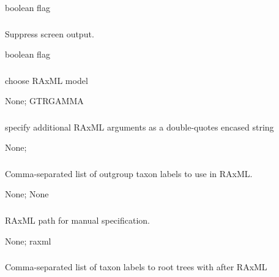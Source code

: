 \documentclass[letterpaper,11pt,english]{sphinxmanual}
\begin{document}
 boolean flag


\subsubsection{}
\label{\detokenize{prog_desc:id115}}
 Suppress screen output.

 boolean flag


\subsubsection{}
\label{\detokenize{prog_desc:raxml-model-raxmlmodel}}
 choose RAxML model

 None;  GTRGAMMA


\subsubsection{}
\label{\detokenize{prog_desc:raxml-opts-raxmlopts}}
 specify additional RAxML arguments as a double-quotes encased string

 None; 


\subsubsection{}
\label{\detokenize{prog_desc:raxml-outgroups-raxmloutgroups}}
 Comma-separated list of outgroup taxon labels to use in RAxML.

 None;  None


\subsubsection{}
\label{\detokenize{prog_desc:id116}}
 RAxML path for manual specification.

 None;  raxml


\subsubsection{}
\label{\detokenize{prog_desc:root-with-rootwith}}
 Comma-separated list of taxon labels to root trees with after RAxML
\end{document}
